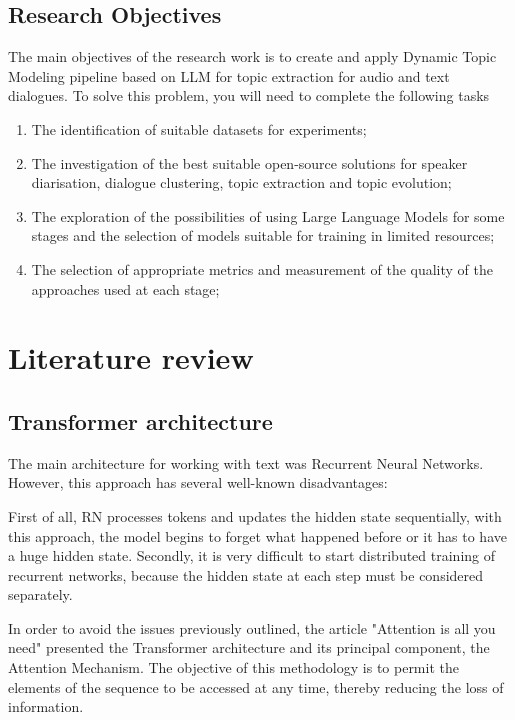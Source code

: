 \documentclass[PMI,VKR]{HSEUniversity}
\begin{document}
\section{Research Objectives}

The main objectives of the research work is to create and apply Dynamic Topic Modeling pipeline based on LLM for topic extraction for audio and text dialogues. 
To solve this problem, you will need to complete the following tasks 
\begin{enumerate}
    \item The identification of suitable datasets for experiments;
    \item The investigation of the best suitable open-source solutions for speaker diarisation, dialogue clustering, topic extraction and topic evolution;
    \item The exploration of the possibilities of using Large Language Models for some stages and the selection of models suitable for training in limited resources;
    \item The selection of appropriate metrics and measurement of the quality of the approaches used at each stage;
\end{enumerate}

    
\chapter{Literature review}

\section{Transformer architecture}

The main architecture for working with text was Recurrent Neural Networks. However, this approach has several well-known disadvantages:

First of all, RN processes tokens and updates the hidden state sequentially, with this approach, the model begins to forget what happened before or it has to have a huge hidden state.
Secondly, it is very difficult to start distributed training of recurrent networks, because the hidden state at each step must be considered separately.

In order to avoid the issues previously outlined, the article "Attention is all you need" \cite{attention:2017} presented the Transformer architecture and its principal component, 
the Attention Mechanism. The objective of this methodology is to permit the elements of the sequence to be accessed at any time, thereby reducing the loss of information.
\end{document}

